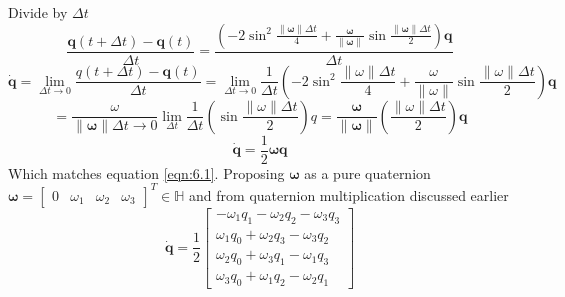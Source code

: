 Divide by $\Delta t$
\begin{equation}
    \frac{\mathbf{q}(t+\Delta t)-\mathbf{q}(t)}{\Delta t}=\frac{\left(-2 \sin ^{2} \frac{\|\boldsymbol{\omega}\| \Delta t}{4}+\frac{\boldsymbol{\omega}}{\|\boldsymbol{\omega}\|} \sin \frac{\|\boldsymbol{\omega}\| \Delta t}{2}\right) \mathbf{q}}{\Delta t}
\end{equation}
\begin{equation}
    \dot{\mathbf{q}}=\lim _{\Delta t \rightarrow 0} \frac{q(t+\Delta t)-\mathbf{q}(t)}{\Delta t}=\lim _{\Delta t \rightarrow 0} \frac{1}{\Delta t}\left(-2 \sin ^{2} \frac{\|\omega\| \Delta t}{4}+\frac{\omega}{\|\omega\|} \sin \frac{\|\omega\| \Delta t}{2}\right) \mathbf{q}
\end{equation}
\begin{equation}
    =\frac{\omega}{\|\boldsymbol{\omega}\| \Delta t \rightarrow 0} \lim _{\Delta t} \frac{1}{\Delta t}\left(\sin \frac{\|\omega\| \Delta t}{2}\right) q=\frac{\boldsymbol{\omega}}{\|\boldsymbol{\omega}\|}\left(\frac{\|\omega\| \Delta t}{2}\right) \mathbf{q}
\end{equation}
\[\boxed{
\dot{\mathbf{q}}=\frac{1}{2} \boldsymbol{\omega} \mathbf{q}
}\]
Which matches equation \ref{eqn:6.1}.
Proposing $\boldsymbol{\omega}$ as a pure quaternion $\boldsymbol{\omega}=\left[\begin{array}{llll}0 & \omega_{1} & \omega_{2} & \omega_{3}\end{array}\right]^{T} \in \mathbb{H}$ and from quaternion multiplication discussed earlier
\begin{equation}
    \dot{\mathbf{q}}=\frac{1}{2}\left[\begin{array}{c}
-\omega_{1} q_{1}-\omega_{2} q_{2}-\omega_{3} q_{3} \\
\omega_{1} q_{0}+\omega_{2} q_{3}-\omega_{3} q_{2} \\
\omega_{2} q_{0}+\omega_{3} q_{1}-\omega_{1} q_{3} \\
\omega_{3} q_{0}+\omega_{1} q_{2}-\omega_{2} q_{1}
\end{array}\right]
\end{equation}

